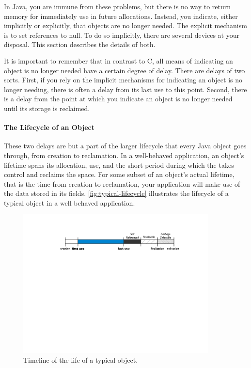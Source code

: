 In Java, you are immune from these problems, but there is no way to return memory
for immediately use in future allocations. Instead, you indicate, either
implicitly or explicitly, that objects are no longer needed. The explicit
mechanism is to set references to null. To do so implicitly, there are several
devices at your disposal. This section describes the details of both.

It is important to remember that in contrast to C, all means of indicating an
object is no longer needed have a certain degree of delay. There are delays of
two sorts. First, if you rely on the implicit mechanisms for indicating an object is no
longer needing, there is often a delay from its last use to this point. Second,
there is a delay from the point at which you indicate an object is no longer
needed until its storage is reclaimed.

\paragraph{The Lifecycle of an Object}
These two delays are but a part of the larger lifecycle that every Java object
goes through, from creation to reclamation. In a well-behaved application, an
object's lifetime spans its allocation, use, and the short period during which
the \jre takes control and reclaims the space. For some subset of an object's
actual lifetime, that is the time from creation to reclamation, your application
will make use of the data stored in its fields. \autoref{fig:typical-lifecycle}
illustrates the lifecycle of a typical object in a well behaved application.

\begin{figure}
	\includegraphics[width=0.9\textwidth]{part4/Figures/lifetime/object-lifecycle}
	\caption{Timeline of the life of a typical object.}
	\label{fig:typical-lifecycle}
\end{figure}


